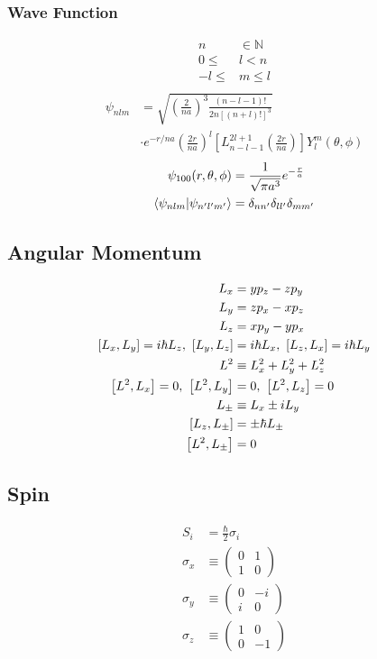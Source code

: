 \documentclass[8pt]{amsart}
\newcommand{\N}{\mathbb{N}}
\begin{document}
\begin{multicols}{3}
\subsubsection{Wave Function}%
\label{ssub:wave_function}

\begin{align*}
  n&\in\N\\
  0\leq &l < n\\
  -l\leq &m \leq l\\
\end{align*}
\begin{align*}
  \psi_{nlm}&=\sqrt{\left(\frac{2}{na}\right)^3\frac{(n-l-1)!}{2n\left[(n+l)!\right]^3}}\\
             &\cdot e^{-r/na}\left(\frac{2r}{na}\right)^l\left[L_{n-l-1}^{2l+1}\left(\frac{2r}{na}\right)\right]Y_l^m(\theta,\phi)
\end{align*}
\begin{align*}
  \psi_{100}(r,\theta,\phi)&=\frac{1}{\sqrt{\pi a^3}}e^{-\frac{r}{a}}\\
  \braket{\psi_{nlm}}{\psi_{n'l'm'}}&=\delta_{nn'}\delta_{ll'}\delta_{mm'}
\end{align*}

\subsection{Angular Momentum}%
\label{sub:angular_momentum}
\begin{align*}
  L_x&=yp_z-zp_y\\
  L_y&=zp_x-xp_z\\
  L_z&=xp_y-yp_x\\
  \comm{L_x}{L_y}=i\hbar L_z,\ 
  \comm{L_y}{L_z}&=i\hbar L_x,\ 
  \comm{L_z}{L_x}=i\hbar L_y\\
  L^2&\equiv L_x^2+L_y^2+L_z^2\\
  \comm{L^2}{L_x}=0,\ 
  \comm{L^2}{L_y}&=0,\ 
  \comm{L^2}{L_z}=0\\
  L_\pm&\equiv L_x\pm iL_y\\
  \comm{L_z}{L_\pm}&=\pm\hbar L_\pm\\
  \comm{L^2}{L_\pm}&=0
\end{align*}

\subsection{Spin}%
\label{sub:spin}
\begin{align*}
  S_i&=\frac{\hbar}{2}\sigma_i\\
  \sigma_x&\equiv\begin{pmatrix}
    0 & 1 \\ 1 & 0
  \end{pmatrix}\\
  \sigma_y&\equiv\begin{pmatrix}
    0 & -i \\ i & 0
  \end{pmatrix}\\
  \sigma_z&\equiv\begin{pmatrix}
    1 & 0 \\ 0 & -1
  \end{pmatrix}
\end{align*}

\end{multicols}
\end{document}
